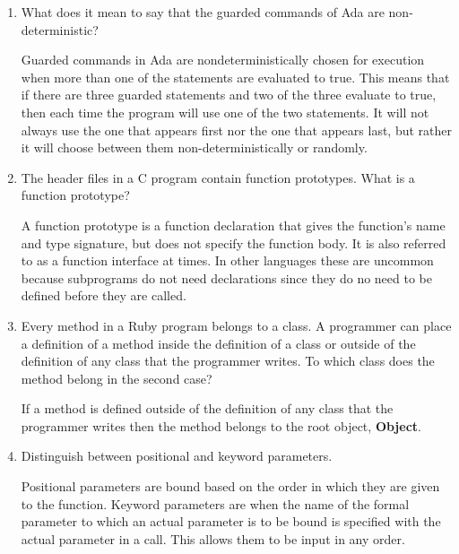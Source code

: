 \begin{enumerate}
  \item What does it mean to say that the guarded commands
    of Ada are non-deterministic?

  \begin{answer}
  Guarded commands in Ada are nondeterministically chosen for execution when more than one of the statements are evaluated to true. This means that if there are three guarded statements and two of the three evaluate to true, then each time the program will use one of the two statements. It will not always use the one that appears first nor the one that appears last, but rather it will choose between them non-deterministically or randomly.
  \end{answer}
  \item The header files in a C program contain function
    prototypes. What is a function prototype?

  \begin{answer}
   A function prototype is a function declaration that gives the function's name and type signature, but does not specify the function body. It is also referred to as a function interface at times. In other languages these are uncommon because subprograms do not need declarations since they do no need to be defined before they are called. 

  \end{answer}

  \item Every method in a Ruby program belongs to a class.
    A programmer can place a definition of a method inside
    the definition of a class or outside of the definition
    of any class that the programmer writes. To which class
    does the method belong in the second case?

  \begin{answer}
  If a method is defined outside of the definition of any class that the programmer writes then the method belongs to the root object, \textbf{Object}.
  \end{answer}

  \item Distinguish between positional and keyword parameters.
  
  \begin{answer}
  Positional parameters are bound based on the order in which they are given to the function. Keyword parameters are when the name of the formal parameter to which an actual parameter is to be bound is specified with the actual parameter in a call. This allows them to be input in any order.


\end{answer}
\end{enumerate}
